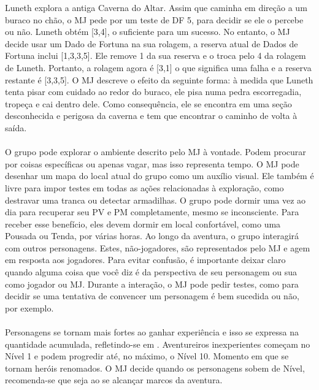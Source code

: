 %
\ofpar
%
{
	Luneth explora a antiga Caverna do Altar. 
	Assim que caminha em direção a um buraco no chão, o MJ pede por um teste de DF 5, para decidir se ele o percebe ou não. Luneth obtém [3,4], o suficiente para um sucesso. 
	No entanto, o MJ decide usar um Dado de Fortuna na sua rolagem, a reserva atual de Dados de Fortuna inclui [1,3,3,5]. 
	Ele remove 1 da sua reserva e o troca pelo 4 da rolagem de Luneth. 
	Portanto, a rolagem agora é [3,1] o que significa uma falha e a reserva restante é [3,3,5]. 
	O MJ descreve o efeito da seguinte forma: à medida que Luneth tenta pisar com cuidado ao redor do buraco, ele pisa numa pedra escorregadia, tropeça e cai dentro dele. 
	Como consequência, ele se encontra em uma seção desconhecida e perigosa da caverna e tem que encontrar o caminho de volta à saída.
}
%
\ofpar
%
\\\\
%
	 O grupo pode explorar o ambiente descrito pelo MJ à vontade. 
	 Podem procurar por coisas específicas ou apenas vagar, mas isso representa tempo. 
	 O MJ pode desenhar um mapa do local atual do grupo como um auxílio visual. 
	 Ele também é livre para impor testes em todas as ações relacionadas à exploração, como destravar uma tranca ou detectar armadilhas. 
	 O grupo pode dormir uma vez ao dia para recuperar seu PV e PM completamente, mesmo se inconsciente.
	 Para receber esse benefício, eles devem dormir em local confortável, como uma Pousada ou Tenda, por várias horas. 
	 Ao longo da aventura, o grupo interagirá com outros personagens. 
	 Estes, não-jogadores, são representados pelo MJ e agem em resposta aos jogadores.
	 Para evitar confusão, é importante deixar claro quando alguma coisa que você diz é da perspectiva de seu personagem ou sua como jogador ou MJ. 
	 Durante a interação, o MJ pode pedir testes, como para decidir se uma tentativa de convencer um personagem é bem sucedida ou não, por exemplo.
%
\vfill
%
\\\\
%
Personagens se tornam mais fortes ao ganhar experiência e isso se expressa na quantidade acumulada, refletindo-se em .
Aventureiros inexperientes começam no Nível 1 e podem progredir até, no máximo, o Nível 10. Momento em que se tornam heróis renomados. 
O MJ decide quando os personagens sobem de Nível, recomenda-se que seja ao se alcançar marcos da aventura. 
